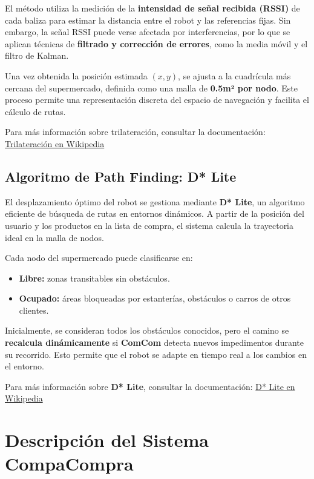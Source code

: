 \documentclass[a4paper,12pt]{article}
\begin{document}
El método utiliza la medición de la \textbf{intensidad de señal recibida (RSSI)} de cada baliza para estimar la distancia entre el robot y las referencias fijas. Sin embargo, la señal RSSI puede verse afectada por interferencias, por lo que se aplican técnicas de \textbf{filtrado y corrección de errores}, como la media móvil y el filtro de Kalman.

Una vez obtenida la posición estimada \((x, y)\), se ajusta a la cuadrícula más cercana del supermercado, definida como una malla de \textbf{0.5m² por nodo}. Este proceso permite una representación discreta del espacio de navegación y facilita el cálculo de rutas.

Para más información sobre trilateración, consultar la documentación:
\href{https://es.wikipedia.org/wiki/Trilateraci%C3%B3n}{Trilateración en Wikipedia}

\subsection{Algoritmo de Path Finding: D* Lite}
El desplazamiento óptimo del robot se gestiona mediante \textbf{D* Lite}, un algoritmo eficiente de búsqueda de rutas en entornos dinámicos. A partir de la posición del usuario y los productos en la lista de compra, el sistema calcula la trayectoria ideal en la malla de nodos.

Cada nodo del supermercado puede clasificarse en:
\begin{itemize}
\item \textbf{Libre:} zonas transitables sin obstáculos.
\item \textbf{Ocupado:} áreas bloqueadas por estanterías, obstáculos o carros de otros clientes.
\end{itemize}

Inicialmente, se consideran todos los obstáculos conocidos, pero el camino se \textbf{recalcula dinámicamente} si \textbf{ComCom} detecta nuevos impedimentos durante su recorrido. Esto permite que el robot se adapte en tiempo real a los cambios en el entorno.

Para más información sobre \textbf{D* Lite}, consultar la documentación:
\href{https://es.wikipedia.org/wiki/D*#D*_Lite}{D* Lite en Wikipedia}

\section{Descripción del Sistema CompaCompra}
\end{document}
